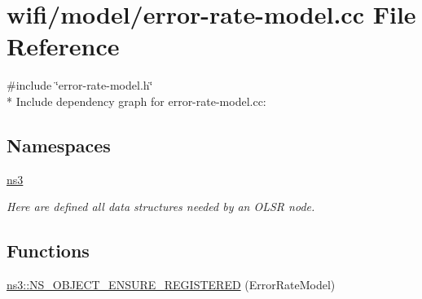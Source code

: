 \hypertarget{error-rate-model_8cc}{}\section{wifi/model/error-\/rate-\/model.cc File Reference}
\label{error-rate-model_8cc}
{\ttfamily \#include \char`\"{}error-\/rate-\/model.\+h\char`\"{}}\\*
Include dependency graph for error-\/rate-\/model.cc\+:
\subsection*{Namespaces}
\begin{DoxyCompactItemize}
\item 
 \hyperlink{namespacens3}{ns3}
\begin{DoxyCompactList}\small\item\em Here are defined all data structures needed by an O\+L\+SR node. \end{DoxyCompactList}\end{DoxyCompactItemize}
\subsection*{Functions}
\begin{DoxyCompactItemize}
\item 
\hyperlink{namespacens3_a3cca7d8de7a69052b2a5e127a070f2a8}{ns3\+::\+N\+S\+\_\+\+O\+B\+J\+E\+C\+T\+\_\+\+E\+N\+S\+U\+R\+E\+\_\+\+R\+E\+G\+I\+S\+T\+E\+R\+ED} (Error\+Rate\+Model)
\end{DoxyCompactItemize}
